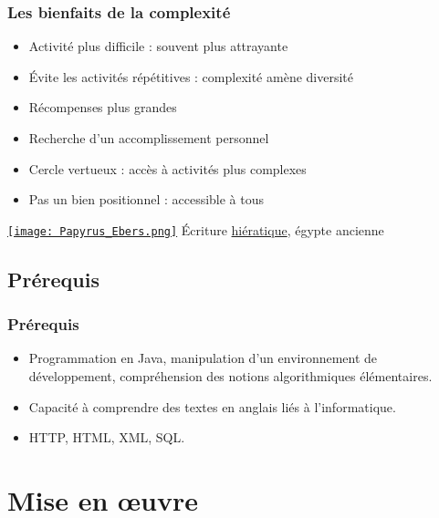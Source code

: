 \documentclass[english, french]{beamer}
\begin{document}
\begin{frame}
	\frametitle{Les bienfaits de la complexité}
	\begin{minipage}{6cm}
		\begin{itemize}
			\item Activité plus difficile : souvent plus attrayante
			\item Évite les activités répétitives : complexité amène diversité
			\item Récompenses plus grandes
			\item Recherche d’un accomplissement personnel
			\item Cercle vertueux : accès à activités plus complexes
			\item Pas un bien positionnel : accessible à tous
		\end{itemize}
	\end{minipage}\hspace{5mm}%
	\begin{minipage}{\columnwidth-6.5cm}
		\href{https://fr.wikipedia.org/wiki/\%C3\%89criture_hi\%C3\%A9ratique}{\texttt{[image: Papyrus\_Ebers.png]}}
		\small{Écriture \href{https://en.wikipedia.org/wiki/Hieratic}{hiératique}, égypte ancienne}
	\end{minipage}
\end{frame}

\subsection{Prérequis}
\begin{frame}
	\frametitle{Prérequis}
	\begin{itemize}
		\item Programmation en Java, manipulation d’un environnement de développement, compréhension des notions algorithmiques élémentaires.
		\item Capacité à comprendre des textes en anglais liés à l’informatique.
		\item HTTP, HTML, XML, SQL.
	\end{itemize}
\end{frame}

\section{Mise en œuvre}
\end{document}
